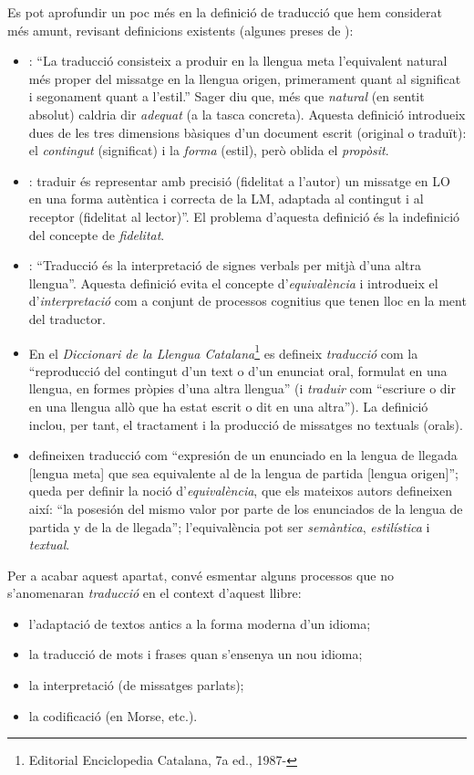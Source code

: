 Es pot aprofundir un poc més en la definició de traducció que hem
considerat més amunt, revisant definicions existents (algunes preses
de \citealt{sager93b}):
\begin{itemize}
\item \citet[p.~19]{nida59b}: ``La traducció consisteix a produir en
  la llengua meta l'equivalent natural més proper del missatge en la
  llengua origen, primerament quant al significat i segonament quant a
  l'estil.'' Sager diu que, més que \emph{natural} (en sentit absolut)
  caldria dir \emph{adequat} (a la tasca concreta). Aquesta definició
  introdueix dues de les tres dimensions bàsiques d'un document escrit
  (original o traduït): el \emph{contingut} (significat) i la
  \emph{forma} (estil), però oblida el \emph{propòsit}.
\item \citet{flamand83b}: traduir és representar amb precisió
  (fidelitat a l'autor) un missatge en LO en una forma autèntica i
  correcta de la LM, adaptada al contingut i al receptor (fidelitat al
  lector)''. El problema d'aquesta definició és la indefinició del
  concepte de \emph{fidelitat}.
\item \citet{jakobson66b}: ``Traducció és la interpretació de signes
  verbals per mitjà d'una altra llengua''. Aquesta definició evita el
  concepte d'\emph{equi\-va\-lèn\-cia} i introdueix el
  d'\emph{interpretació} com a conjunt de processos cognitius que
  tenen lloc en la ment del traductor.
\item En el \emph{Diccionari de la Llengua
    Catalana}\footnote{Editorial Enciclopedia Catalana, 7a ed., 1987-}
  es defineix {\em traducció} com la ``reproducció del contingut d'un
  text o d'un enunciat oral, formulat en una llengua, en formes
  pròpies d'una altra llengua'' (i \emph{traduir} com ``escriure o dir
  en una llengua allò que ha estat escrit o dit en una altra''). La
  definició inclou, per tant, el tractament i la producció de
  missatges no textuals (orals).
\item \citet{alcaraz97b} defineixen traducció com ``expresión de un
  enunciado en la lengua de llegada [lengua meta] que sea equivalente
  al de la lengua de partida [lengua origen]''; queda per definir la
  noció d'\emph{equivalència}, que els mateixos autors defineixen
  així: ``la posesión del mismo valor por parte de los enunciados de
  la lengua de partida y de la de llegada''; l'equivalència pot ser
  {\em semàntica}, \emph{estilística} i \emph{textual}.
\end{itemize}

Per a acabar aquest apartat, convé esmentar alguns processos que no
s'anomenaran \emph{traducció} en el context d'aquest llibre:
\begin{itemize}
\item l'adaptació de textos antics a la forma moderna d'un idioma;
\item la traducció de mots i frases quan s'ensenya un nou idioma;
\item la interpretació (de missatges parlats);
\item la codificació (en Morse, etc.).
\end{itemize}

